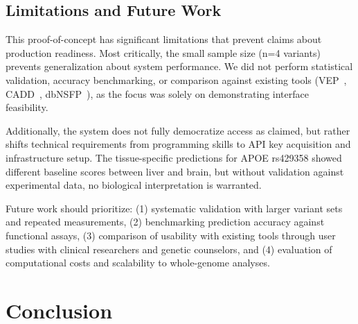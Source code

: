 \documentclass[11pt]{article}
\begin{document}
\subsection*{Limitations and Future Work}

This proof-of-concept has significant limitations that prevent claims about production readiness. Most critically, the small sample size (n=4 variants) prevents generalization about system performance. We did not perform statistical validation, accuracy benchmarking, or comparison against existing tools (VEP~\cite{mclaren2016}, CADD~\cite{rentzsch2019}, dbNSFP~\cite{liu2016}), as the focus was solely on demonstrating interface feasibility.

Additionally, the system does not fully democratize access as claimed, but rather shifts technical requirements from programming skills to API key acquisition and infrastructure setup. The tissue-specific predictions for APOE rs429358 showed different baseline scores between liver and brain, but without validation against experimental data, no biological interpretation is warranted.

Future work should prioritize: (1) systematic validation with larger variant sets and repeated measurements, (2) benchmarking prediction accuracy against functional assays, (3) comparison of usability with existing tools through user studies with clinical researchers and genetic counselors, and (4) evaluation of computational costs and scalability to whole-genome analyses.

\section{Conclusion}
\end{document}
